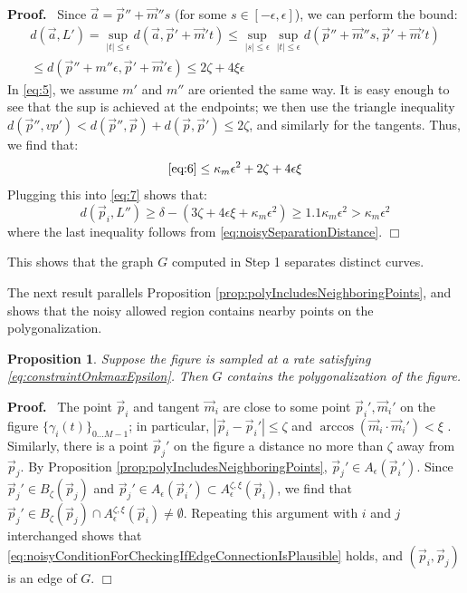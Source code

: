 \documentclass{article}
\newtheorem{proposition}[cntr]{Proposition}
\newenvironment{proof}{
  \noindent\textbf{Proof.}\ }{\hspace*{\fill}
  \begin{math}\Box\end{math}\medskip}
\numberwithin{cntr}{section}
\numberwithin{equation}{section}
\newcommand{\abs}[1]{\left| #1 \right|}%
\newcommand{\vp}[0]{{\vec{p}}}
\newcommand{\vm}[0]{{\vec{m}}}
\newcommand{\va}[0]{{\vec{a}}}
\newcommand{\Oto}[1]{{0 \ldots #1-1}}
\newcommand{\curveSet}{{ \{ \gamma_i(t) \}_{\Oto{M}}}}
\newcommand{\ball}[2]{ { B_{#1}(#2) } }
\newcommand{\allowed}[2]{ { A_{#1}(#2) } }
\newcommand{\curvemax}{{\kappa_{m}}}
\newcommand{\curvesep}{{\delta}}
\newcommand{\pointNoise}{{\zeta}}
\newcommand{\tanNoise}{{\xi}}
\newcommand{\nallowed}[2]{ { A^{\pointNoise, \tanNoise}_{#1}(#2) } }
\begin{document}
\begin{proof}
  Since $\va=\vp'' + \vm'' s$ (for some $s \in [-\epsilon,\epsilon]$), we can perform the bound:
  \begin{multline}
    \label{eq:5}
    d(\va,L') = \sup_{\abs{t} \leq \epsilon} d(\va, \vp' + \vm' t) \leq \sup_{\abs{s} \leq \epsilon} \sup_{ \abs{t} \leq \epsilon} d(\vp'' + \vm'' s, \vp' + \vm' t) \\
    \leq d(\vp'' + m'' \epsilon, \vp' + \vm' \epsilon) \leq 2 \pointNoise + 4 \tanNoise \epsilon
  \end{multline}
  In \eqref{eq:5}, we assume $m'$ and $m''$ are oriented the same way. It is easy enough to see that the sup is achieved at the endpoints; we then use the triangle inequality $d(\vp'', vp') < d(\vp'', \vp) + d(\vp, \vp') \leq 2 \pointNoise$, and similarly for the tangents.
  Thus, we find that:
  \begin{equation}
    \eqref{eq:6} \leq \curvemax \epsilon^{2} + 2 \pointNoise + 4 \epsilon \tanNoise
  \end{equation}
  Plugging this into \eqref{eq:7} shows that:
  \begin{equation}
    d(\vp_{i},L'') \geq \curvesep - (3 \pointNoise + 4 \epsilon \tanNoise + \curvemax \epsilon^{2}) \geq 1.1 \curvemax \epsilon^{2} > \curvemax \epsilon^{2}
  \end{equation}
  where the last inequality follows from \eqref{eq:noisySeparationDistance}.
\end{proof}

This shows that the graph $G$ computed in Step 1 separates distinct curves.

The next result parallels Proposition \ref{prop:polyIncludesNeighboringPoints}, and shows that the noisy allowed region contains nearby points on the polygonalization.

\begin{proposition}
  Suppose the figure is sampled at a rate satisfying \eqref{eq:constraintOnkmaxEpsilon}. Then $G$ contains the polygonalization of the figure.
\end{proposition}

\begin{proof}
  The point $\vp_{i}$ and tangent $\vm_{i}$ are close to some point $\vp_{i}', \vm_{i}'$ on the figure $\curveSet$; in particular, $\abs{\vp_{i} - \vp_{i}'} \leq \pointNoise$ and $\arccos(\vm_{i} \cdot \vm_{i}') < \tanNoise$ . Similarly, there is a point $\vp_{j}'$ on the figure a distance no more than $\pointNoise$ away from $\vp_{j}$. By Proposition \ref{prop:polyIncludesNeighboringPoints}, $\vp_{j}' \in \allowed{\epsilon}{\vp_{i}'}$. Since $\vp_{j}' \in \ball{\pointNoise}{\vp_{j}}$ and $\vp_{j}' \in \allowed{\epsilon}{\vp_{i}'} \subset \nallowed{\epsilon}{\vp_{i}}$, we find that $\vp_{j}' \in \ball{\pointNoise}{\vp_{j}} \cap \nallowed{\epsilon}{\vp_{i}} \neq \emptyset$. Repeating this argument with $i$ and $j$ interchanged shows that \eqref{eq:noisyConditionForCheckingIfEdgeConnectionIsPlausible} holds, and $(\vp_{i}, \vp_{j})$ is an edge of $G$.
\end{proof}
\end{document}
